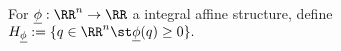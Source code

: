 

    For $\underline \phi: \RR^n\to \RR$ a integral affine structure, define $H_{\underline \phi}:= \{q\in \RR^n \st \underline\phi(q) \geq 0 \}.$

